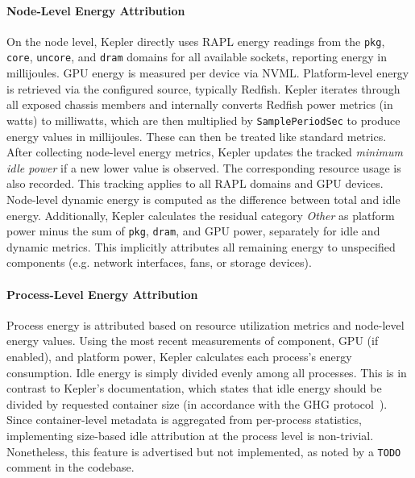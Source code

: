 \paragraph{Node-Level Energy Attribution}
On the node level, Kepler directly uses RAPL energy readings from the \texttt{pkg}, \texttt{core}, \texttt{uncore}, and \texttt{dram} domains for all available sockets, reporting energy in millijoules. GPU energy is measured per device via NVML. Platform-level energy is retrieved via the configured source, typically Redfish. Kepler iterates through all exposed chassis members and internally converts Redfish power metrics (in watts) to milliwatts, which are then multiplied by \texttt{SamplePeriodSec} to produce energy values in millijoules. These can then be treated like standard metrics.\\
After collecting node-level energy metrics, Kepler updates the tracked \emph{minimum idle power} if a new lower value is observed. The corresponding resource usage is also recorded. This tracking applies to all RAPL domains and GPU devices. Node-level dynamic energy is computed as the difference between total and idle energy. Additionally, Kepler calculates the residual category \emph{Other} as platform power minus the sum of \texttt{pkg}, \texttt{dram}, and GPU power, separately for idle and dynamic metrics. This implicitly attributes all remaining energy to unspecified components (e.g. network interfaces, fans, or storage devices).

\paragraph{Process-Level Energy Attribution}
Process energy is attributed based on resource utilization metrics and node-level energy values. Using the most recent measurements of component, GPU (if enabled), and platform power, Kepler calculates each process’s energy consumption.  
Idle energy is simply divided evenly among all processes. This is in contrast to Kepler’s documentation, which states that idle energy should be divided by requested container size (in accordance with the GHG protocol~\parencite{gesi2024ictguidance}). Since container-level metadata is aggregated from per-process statistics, implementing size-based idle attribution at the process level is non-trivial. Nonetheless, this feature is advertised but not implemented, as noted by a \texttt{TODO} comment in the codebase.

